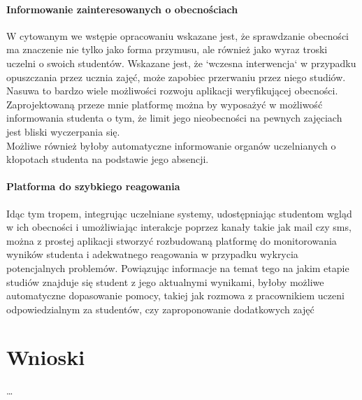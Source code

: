 \documentclass[declaration,shortabstract, mgr]{iithesis}
\begin{document}
\subsubsection{Informowanie zainteresowanych o obecnościach}
\indent W cytowanym we wstępie opracowaniu \cite{theory_base} wskazane jest, że sprawdzanie obecności ma znaczenie nie tylko jako forma przymusu, ale również jako wyraz troski uczelni o swoich studentów. Wskazane jest, że `wczesna interwencja` w przypadku opuszczania przez ucznia zajęć, może zapobiec przerwaniu przez niego studiów. Nasuwa to bardzo wiele możliwości rozwoju aplikacji weryfikującej obecności. Zaprojektowaną przeze mnie platformę można by wyposażyć w możliwość informowania studenta o tym, że limit jego nieobecności na pewnych zajęciach jest bliski wyczerpania się. \\
\indent Możliwe również byłoby automatyczne informowanie organów uczelnianych o kłopotach studenta na podstawie jego absencji. \\
\subsubsection{Platforma do szybkiego reagowania}
\indent Idąc tym tropem, integrując uczelniane systemy, udostępniając studentom wgląd w ich obecności i umożliwiając interakcje poprzez kanały takie jak mail czy sms, można z prostej aplikacji stworzyć rozbudowaną platformę do monitorowania wyników studenta i adekwatnego reagowania w przypadku wykrycia potencjalnych problemów. Powiązując informacje na temat tego na jakim etapie studiów znajduje się student z jego aktualnymi wynikami, byłoby możliwe automatyczne dopasowanie pomocy, takiej jak rozmowa z pracownikiem uczeni odpowiedzialnym za studentów, czy zaproponowanie dodatkowych zajęć

\chapter{Wnioski}

\ldots
\end{document}
